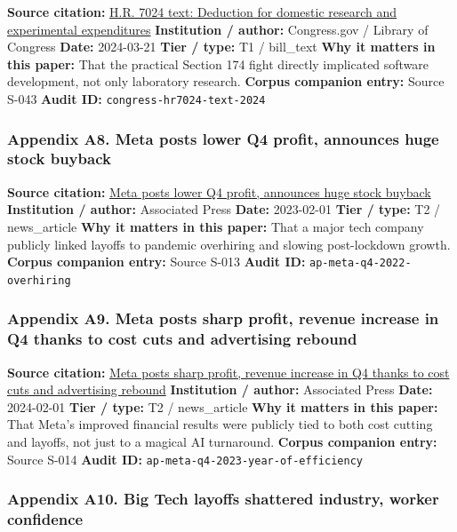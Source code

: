 \documentclass[
  american,
  11pt,
  letterpaper,
]{article}
\begin{document}
\textbf{Source citation:}
\href{https://www.congress.gov/bill/118th-congress/house-bill/7024/text}{H.R.
7024 text: Deduction for domestic research and experimental
expenditures} \textbf{Institution / author:} Congress.gov / Library of
Congress \textbf{Date:} 2024-03-21 \textbf{Tier / type:} T1 / bill\_text
\textbf{Why it matters in this paper:} That the practical Section 174
fight directly implicated software development, not only laboratory
research. \textbf{Corpus companion entry:} Source S-043 \textbf{Audit
ID:} \texttt{congress-hr7024-text-2024}

\subsubsection{Appendix A8. Meta posts lower Q4 profit, announces huge
stock
buyback}\label{appendix-a8-meta-posts-lower-q4-profit-announces-huge-stock-buyback}

\textbf{Source citation:}
\href{https://apnews.com/article/b884c9ac96be1c22f81d7243176a321d}{Meta
posts lower Q4 profit, announces huge stock buyback} \textbf{Institution
/ author:} Associated Press \textbf{Date:} 2023-02-01 \textbf{Tier /
type:} T2 / news\_article \textbf{Why it matters in this paper:} That a
major tech company publicly linked layoffs to pandemic overhiring and
slowing post-lockdown growth. \textbf{Corpus companion entry:} Source
S-013 \textbf{Audit ID:} \texttt{ap-meta-q4-2022-overhiring}

\subsubsection{Appendix A9. Meta posts sharp profit, revenue increase in
Q4 thanks to cost cuts and advertising
rebound}\label{appendix-a9-meta-posts-sharp-profit-revenue-increase-in-q4-thanks-to-cost-cuts-and-advertising-rebound}

\textbf{Source citation:}
\href{https://apnews.com/article/abc3e389d97fb97c661ccb6acfcf65c7}{Meta
posts sharp profit, revenue increase in Q4 thanks to cost cuts and
advertising rebound} \textbf{Institution / author:} Associated Press
\textbf{Date:} 2024-02-01 \textbf{Tier / type:} T2 / news\_article
\textbf{Why it matters in this paper:} That Meta's improved financial
results were publicly tied to both cost cutting and layoffs, not just to
a magical AI turnaround. \textbf{Corpus companion entry:} Source S-014
\textbf{Audit ID:} \texttt{ap-meta-q4-2023-year-of-efficiency}

\subsubsection{Appendix A10. Big Tech layoffs shattered industry, worker
confidence}\label{appendix-a10-big-tech-layoffs-shattered-industry-worker-confidence}
\end{document}
